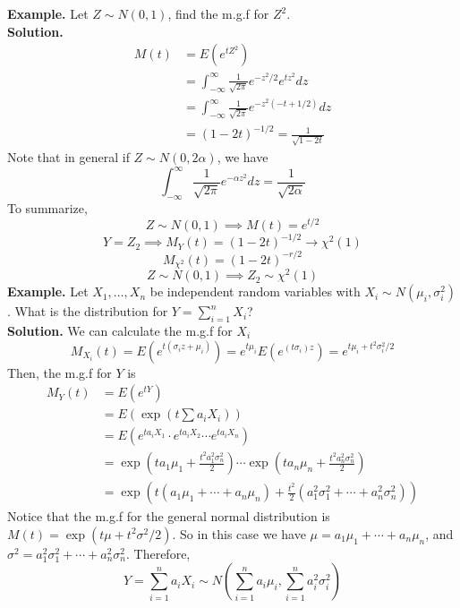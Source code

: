 \documentclass[openany]{report}
\begin{document}
\noindent
\textbf{Example.} Let $Z \sim N(0,1)$, find the m.g.f for $Z^2$. \\[2ex]
\textbf{Solution.}
\begin{align*}
    M(t) &= E(e^{tZ^2})\\
    &= \int_{-\infty}^\infty \frac{1}{\sqrt{2\pi}}e^{-z^2/2}e^{tz^2}dz\\
    &= \int_{-\infty}^\infty \frac{1}{\sqrt{2\pi}}e^{-z^2(-t + 1/2)}dz\\
    &= (1-2t)^{-1/2} = \frac{1}{\sqrt{1-2t}}
\end{align*}
Note that in general if $Z \sim N(0, 2\alpha)$, we have 
\[\int_{-\infty}^\infty \frac{1}{\sqrt{2\pi}}e^{-\alpha z^2}dz = \frac{1}{\sqrt{2\alpha}}\]
To summarize,
\[Z \sim N(0,1) \implies M(t) = e^{t/2}\]
\[Y = Z_2 \implies M_Y(t) = (1-2t)^{-1/2} \rightarrow \chi^2(1)\]
\[M_{\chi^2}(t) = (1-2t)^{-r/2}\]
\[Z \sim N(0,1) \implies Z_2 \sim \chi^2(1)\]
\noindent
\textbf{Example.}
Let $X_1, \ldots, X_n$ be independent random variables with $X_i \sim N(\mu_i, \sigma_i^2)$. What is the distribution for $Y = \sum\limits_{i=1}^n X_i$?\\[2ex]
\textbf{Solution.} 
We can calculate the m.g.f for $X_i$ 
\[M_{X_i}(t) = E(e^{t(\sigma_i z + \mu_i)}) = e^{t\mu_i} E(e^{(t\sigma_i)z}) = e^{t\mu_i + t^2\sigma_i^2/2} \]
Then, the m.g.f for $Y$ is
\begin{align*}
    M_Y(t) &= E(e^{tY})\\
    &= E \left(\exp\left(t\sum a_iX_i\right)\right)\\
    &= E(e^{ta_iX_1} \cdot e^{ta_iX_2} \cdots e^{ta_iX_n})\tag{Independence}\\
    &= \exp\left(ta_1\mu_1 + \frac{t^2a_1^2\sigma_n^2}{2}\right) \cdots \exp\left(ta_n\mu_n + \frac{t^2a_n^2\sigma_n^2}{2}\right)\\
    &= \exp\left(t(a_1\mu_1 + \cdots + a_n\mu_n) + \frac{t^2}{2}(a_1^2\sigma_1^2 + \cdots + a_n^2\sigma_n^2)\right)
\end{align*}
Notice that the m.g.f for the general normal distribution is $M(t) = \exp(t\mu + t^2\sigma^2/2)$. So in this case we have $\mu = a_1\mu_1 + \cdots + a_n\mu_n$, and $\sigma^2 = a_1^2\sigma_1^2 + \cdots + a_n^2\sigma_n^2$. Therefore, 
\[Y = \sum_{i=1}^n a_iX_i \sim N\left(\sum_{i=1}^n a_i\mu_i, \sum_{i=1}^n a_i^2\sigma_i^2\right)\]
\end{document}
